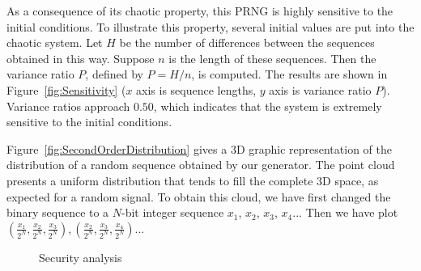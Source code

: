 
As a consequence of its chaotic property, this PRNG is highly sensitive to the initial conditions. To illustrate this property, several initial values are put into the chaotic system. Let $H$ be the number 
of differences between the sequences obtained in this way. Suppose $n$ is the length of these 
sequences. Then the variance ratio $P$, defined by $P = H / n$, is computed. The results are 
shown in Figure~\ref{fig:Sensitivity} ($x$ axis is sequence lengths, $y$ axis is variance ratio $P$). Variance 
ratios approach $0.50$, which indicates that the system is extremely sensitive to the initial 
conditions.





Figure~\ref{fig:SecondOrderDistribution} gives a 3D graphic representation of the distribution of a random sequence obtained by our generator. The point cloud presents a uniform distribution that tends to fill the complete 3D space, as expected for a random signal. To obtain this cloud, we have first changed the binary sequence to a $N$-bit integer sequence $x_1$, $x_2$, $x_3$, $x_4$... Then we have plot $\left(\frac{x_1}{2^N},\frac{x_2}{2^N},\frac{x_3}{2^N}\right), \left(\frac{x_2}{2^N},\frac{x_3}{2^N},\frac{x_4}{2^N}\right)$...


\begin{figure}[h!] 
\centering
{}
\caption{Security analysis}
\label{SecurityAnalysis}
\end{figure}



